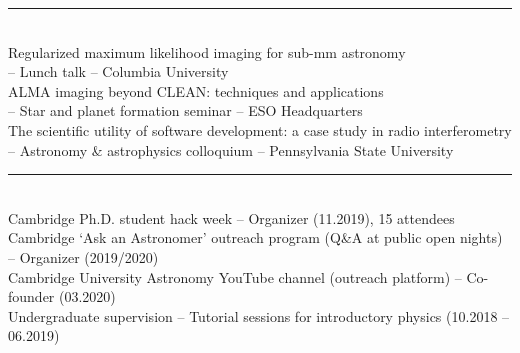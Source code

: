 \documentclass[10pt,preprint]{aastex}
\newcommand{\jj}[1]{\textcolor{red}{#1}}
\newcommand*{\xdash}[1][3em]{\rule[0.5ex]{#1}{0.7pt}}
\begin{document}
 \xdash[94ex] \\
\noindent Regularized maximum likelihood imaging for sub-mm astronomy \\
 -- Lunch talk -- Columbia University \\
\noindent ALMA imaging beyond CLEAN: techniques and applications \\
 -- Star and planet formation seminar -- ESO Headquarters \\
\noindent The scientific utility of software development: a case study in radio interferometry \\
 -- Astronomy \& astrophysics colloquium -- Pennsylvania State University

 \xdash[83ex] \\
\noindent Cambridge Ph.D. student hack week -- Organizer (11.2019), 15 attendees \\
\noindent Cambridge \lq{}Ask an Astronomer\rq{} outreach program (Q\&A at public open nights) -- Organizer (2019/2020) \\
\noindent Cambridge University Astronomy %
YouTube channel (outreach platform) -- Co-founder (03.2020) \\
\noindent Undergraduate supervision -- Tutorial sessions for introductory physics (10.2018 -- 06.2019)

\end{document}
